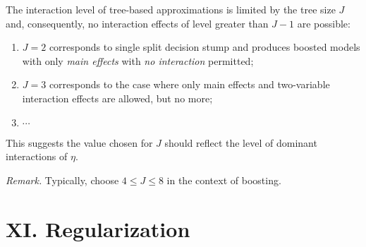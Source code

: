 \documentclass[12pt]{article}
\begin{document}
\begin{enumerate}[label=\textbf{\arabic*.}]
	The interaction level of tree-based approximations is limited by the tree size $J$ and, consequently, no interaction effects of level greater than $J-1$ are possible: 
	\begin{enumerate}
		\item $J = 2$ corresponds to single split decision stump and produces boosted models with only \emph{main effects} with \emph{no interaction} permitted; 
		\item $J = 3$ corresponds to the case where only main effects and two-variable interaction effects are allowed, but no more; 
		\item $\cdots$
	\end{enumerate}
	This suggests the value chosen for $J$ should reflect the level of dominant interactions of $\eta$. 
	
	\textit{Remark.} Typically, choose $4 \le J \le 8$ in the context of boosting. 
	
\end{enumerate}


\section*{XI. Regularization}
\end{document}
